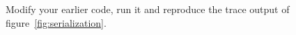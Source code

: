 \label{ex:linear-sequential}
  Modify your earlier code, run it and reproduce the trace output
  of figure~\ref{fig:serialization}.
